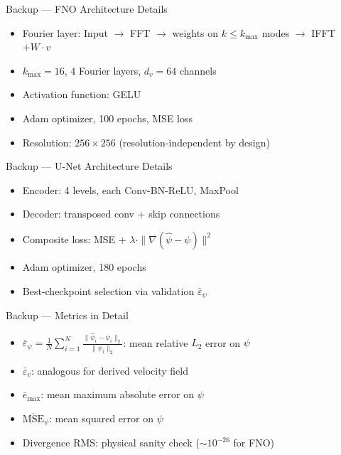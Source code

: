\documentclass[aspectratio=169, 10pt]{beamer}
\begin{document}

\appendix

\begin{frame}{Backup — FNO Architecture Details}
  \begin{itemize}
    \item Fourier layer: Input $\to$ FFT $\to$ weights on $k \leq k_\text{max}$ modes $\to$ IFFT $+ W\cdot v$
    \item $k_\text{max} = 16$, 4 Fourier layers, $d_v = 64$ channels
    \item Activation function: GELU
    \item Adam optimizer, 100 epochs, MSE loss
    \item Resolution: $256 \times 256$ (resolution-independent by design)
  \end{itemize}
\end{frame}

\begin{frame}{Backup — U-Net Architecture Details}
  \begin{itemize}
    \item Encoder: 4 levels, each Conv-BN-ReLU, MaxPool
    \item Decoder: transposed conv + skip connections
    \item Composite loss: MSE + $\lambda \cdot \|\nabla(\hat\psi - \psi)\|^2$
    \item Adam optimizer, 180 epochs
    \item Best-checkpoint selection via validation $\bar{\varepsilon}_\psi$
  \end{itemize}
\end{frame}

\begin{frame}{Backup — Metrics in Detail}
  \begin{itemize}
    \item $\bar{\varepsilon}_\psi = \frac{1}{N}\sum_{i=1}^{N} \frac{\|\hat\psi_i - \psi_i\|_2}{\|\psi_i\|_2}$: mean relative $L_2$ error on $\psi$
    \item $\bar{\varepsilon}_v$: analogous for derived velocity field
    \item $\bar{e}_\text{max}$: mean maximum absolute error on $\psi$
    \item $\overline{\text{MSE}}_\psi$: mean squared error on $\psi$
    \item Divergence RMS: physical sanity check ($\sim10^{-26}$ for FNO)
  \end{itemize}
\end{frame}
\end{document}
